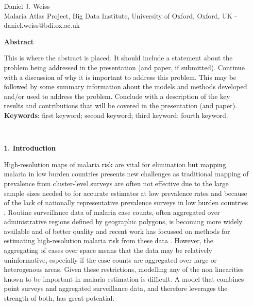 \documentclass[11pt]{article}
\begin{document}
{\begin{center}
\vspace{0.1cm}
{Daniel J. Weiss}\\
{Malaria Atlas Project, Big Data Institute, University of Oxford, Oxford, UK - daniel.weiss@bdi.ox.ac.uk }\\ 

\end{center}

\begin{center}
{\bf Abstract}
\end{center}

\setlength{\parindent}{0pt}

This is where the abstract is placed. It should include a statement about the problem being addressed in the presentation (and paper, if submitted). Continue with a discussion of why it is important to address this problem. This may be followed by some summary information about the models and methods developed and/or used to address the problem. Conclude with a description of the key results and contributions that will be covered in the presentation (and paper).\\


{\bf Keywords}: first keyword; second keyword; third keyword; fourth keyword.
}\\


\setlength{\parindent}{0pt}

{\bf 1. Introduction}



High-resolution maps of malaria risk are vital for elimination but mapping malaria in low burden countries presents new challenges as traditional mapping of prevalence from cluster-level surveys \cite{gething2011new, bhatt2017improved, gething2012long} are often not effective due to the large sample sizes needed to for accurate estimates at low prevalence rates and because of the lack of nationally representative prevalence surveys in low burden countries \cite{sturrock2016mapping, sturrock2014fine}. 
Routine surveillance data of malaria case counts, often aggregated over administrative regions defined by geographic polygons, is becoming more widely available and of better quality and recent work has focussed on methods for estimating high-resolution malaria risk from these data \cite{sturrock2014fine, wilson2017pointless, law2018variational, taylor2017continuous, li2012log}. 
However, the aggregating of cases over space means that the data may be relatively uninformative, especially if the case counts are aggregated over large or heterogenous areas. 
Given these restrictions, modelling any of the non linearities known to be important in malaria estimation is difficult. 
A model that combines point surveys and aggregated surveillance data, and therefore leverages the strength of both, has great potential.
 
\end{document}
